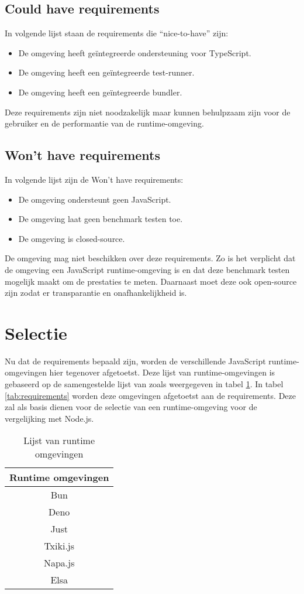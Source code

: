 \subsection{Could have requirements}
In volgende lijst staan de requirements die “nice-to-have” zijn:
\begin{itemize}
    \item De omgeving heeft geïntegreerde ondersteuning voor TypeScript.
    \item De omgeving heeft een geïntegreerde test-runner.
    \item De omgeving heeft een geïntegreerde bundler.
\end{itemize}
Deze requirements zijn niet noodzakelijk maar kunnen behulpzaam zijn voor de gebruiker en de performantie van de runtime-omgeving.

\subsection{Won't have requirements}
In volgende lijst zijn de Won't have requirements:
\begin{itemize}
    \item De omgeving ondersteunt geen JavaScript.
    \item De omgeving laat geen benchmark testen toe. 
    \item De omgeving is closed-source.
\end{itemize}
De omgeving mag niet beschikken over deze requirements. 
Zo is het verplicht dat de omgeving een JavaScript runtime-omgeving is en dat deze benchmark testen mogelijk maakt om de prestaties te meten.
Daarnaast moet deze ook open-source zijn zodat er transparantie en onafhankelijkheid is.

\section{Selectie}
Nu dat de requirements bepaald zijn, worden de verschillende JavaScript runtime-omgevingen hier tegenover afgetoetst.
Deze lijst van runtime-omgevingen is gebaseerd op de samengestelde lijst van \textcite{Errilaz2023} 
zoals weergegeven in tabel \ref{tab:omgevingen}.
In tabel \ref{tab:requirements} worden deze omgevingen afgetoetst aan de requirements. 
Deze zal als basis dienen voor de selectie van een runtime-omgeving voor de vergelijking met Node.js.
\begin{table}[H]
    \begin{tabular}{|c|}
    \hline
    \textbf{Runtime omgevingen} \\ \hline
    Bun                         \\
    Deno                        \\
    Just                        \\
    Txiki.js                    \\
    Napa.js                     \\
    Elsa                        \\ \hline
    \end{tabular}
    \caption{\label{tab:omgevingen}Lijst van runtime omgevingen}
\end{table}


